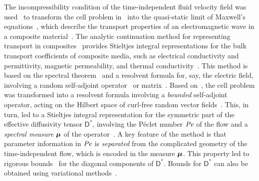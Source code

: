 \documentclass[leqno,onefignum,onetabnum]{siamltex1213}
\newcommand{\Dm}{\mathsf{D}}
\newcommand\Pen{\mbox{\textit{Pe}}}  %
\newcommand\bmu{\mbox{\boldmath${\mu}$}}
\begin{document}
The incompressibility condition of the time-independent fluid velocity
field was used~\cite{Avellaneda:PRL-753,Avellaneda:CMP-339} to
transform the cell problem in~\cite{McLaughlin:SIAM_JAM:780} into the
quasi-static limit of Maxwell's
equations~\cite{Jackson-1999,Golden:CMP-473}, which describe the
transport properties of an electromagnetic wave in a composite
material~\cite{MILTON:2002:TC}. The analytic continuation method for
representing transport in composites~\cite{Golden:CMP-473} provides
Stieltjes integral representations for the bulk transport coefficients
of composite media, such as electrical conductivity and permittivity,
magnetic permeability, and thermal
conductivity~\cite{MILTON:2002:TC}. This method is based on the
spectral theorem~\cite{Stone:64,Reed-1980} and a resolvent formula
for, say, the electric field, involving a random self-adjoint
operator~\cite{Golden:CMP-473,Murphy:JMP:063506} or
matrix~\cite{Murphy:2015:CMS:13:4:825}. Based on~\cite{Golden:CMP-473}, 
the cell problem was transformed into a resolvent formula involving a
\emph{bounded} self-adjoint operator, acting on the Hilbert
space of curl-free random vector
fields~\cite{Avellaneda:PRL-753,Avellaneda:CMP-339}. This, in turn,     
led to a Stieltjes integral representation for the symmetric part of
the effective diffusivity tensor $\Dm^*$, involving the P\'{e}clet
number $\Pen$ of the flow and a \emph{spectral measure} $\bmu$ of the
operator~\cite{Avellaneda:PRL-753,Avellaneda:CMP-339}. A key feature
of the method is that parameter information in $\Pen$ is 
\emph{separated} from the complicated geometry of the time-independent
flow, which is encoded in the measure $\bmu$. This property led to
rigorous bounds~\cite{Avellaneda:CMP-339} for the diagonal components
of $\Dm^*$. Bounds for $\Dm^*$ can also be obtained using variational 
methods~\cite{Avellaneda:CMP-339,Fannjiang:1994:SIAM_JAM:333,Fannjiang:1997:1033}.  
\end{document}
